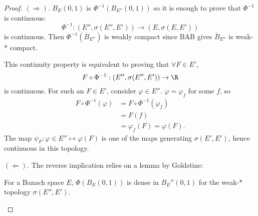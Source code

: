 \documentclass[twoside]{article}
\begin{document}
\begin{proof}
    $(\Rightarrow)$. $B_E(0, 1)$ is $\Phi^{-1}(B_{E''}(0, 1))$ so it is enough to prove that $\Phi^{-1}$ is continuous:
    \begin{equation*}
        \Phi^{-1}: (E'', \sigma(E'', E')) \longrightarrow (E, \sigma(E, E'))
    \end{equation*}
    is continuous.
    Then $\Phi^{-1}(\overline{B}_{E''})$ is weakly compact since BAB gives $\overline{B}_{E''}$ is weak-$*$ compact.

    This continuity property is equivalent to proving that $\forall F \in E'$,
    \begin{equation*}
        F \circ \Phi^{-1}: (E'', \sigma(E'', E')) \to \R
    \end{equation*}
    is continuous.
    For such an $F \in E'$, consider $\varphi \in E''$. $\varphi = \varphi_f$ for some $f$, so
    \begin{align*}
        F \circ \Phi^{-1} (\varphi) &= F \circ \Phi^{-1} (\varphi_f) \\ %
                                 &= F(f) \\
                                 &=\varphi_f(F) = \varphi(F).
    \end{align*}
    The map $\psi_F: \varphi \in E'' \longmapsto \varphi(F)$ is one of the maps generating $\sigma(E', E')$, hence continuous in this topology.

    $(\Leftarrow)$. The reverse implication relies on a lemma by Goldstine:
    \begin{lemma}
        For a Banach space $E$, $\Phi(B_E(0, 1))$ is dense in $B_E''(0, 1)$ for the weak-$*$ topology $\sigma(E'', E')$.
    \end{lemma}

\end{proof}
\end{document}

